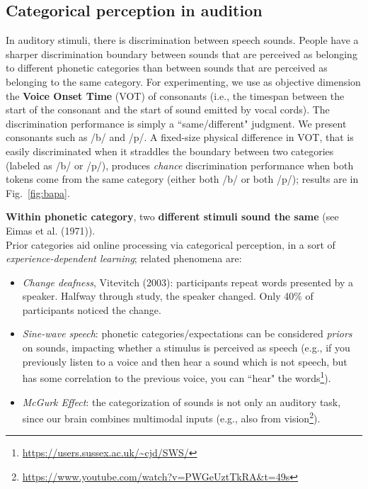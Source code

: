\subsection{Categorical perception in audition}
In auditory stimuli, there is discrimination between speech sounds. People have a sharper discrimination boundary between sounds that are perceived as belonging to different phonetic categories than between sounds that are perceived as belonging to the same category.
For experimenting, we use as objective dimension the \textbf{Voice Onset Time} (VOT) of consonants (i.e., the timespan between the start of the consonant and the start of sound emitted by vocal cords). The discrimination performance is simply a ``same/different" judgment. We present consonants such as /b/ and /p/. A fixed-size physical difference in VOT, that is easily discriminated when it straddles the boundary between two categories (labeled as /b/ or /p/), produces \textit{chance} discrimination performance when both tokens come from the same category (either both /b/ or both /p/); results are in Fig.~\ref{fig:bapa}.

\textbf{Within phonetic category}, two \textbf{different stimuli sound the same} (see \notedv Eimas et al. (1971)).\\

Prior categories aid online processing via categorical perception, in a sort of \textit{experience-dependent learning}; related phenomena are:
\begin{itemize}
    \item \textit{Change deafness}, Vitevitch (2003): participants repeat words presented by a speaker. Halfway through study, the speaker changed. Only 40\% of participants noticed the change.
    \item \textit{Sine-wave speech}: phonetic categories/expectations can be considered \textit{priors} on sounds, impacting whether a stimulus is perceived as speech (e.g., if you previously listen to a voice and then hear a sound which is not speech, but has some correlation to the previous voice, you can ``hear" the words\footnote{\url{https://users.sussex.ac.uk/~cjd/SWS/}}).
    \item \textit{McGurk Effect}: the categorization of sounds is not only an auditory task, since our brain combines multimodal inputs (e.g., also from vision\footnote{\url{https://www.youtube.com/watch?v=PWGeUztTkRA&t=49s}}).
\end{itemize}

